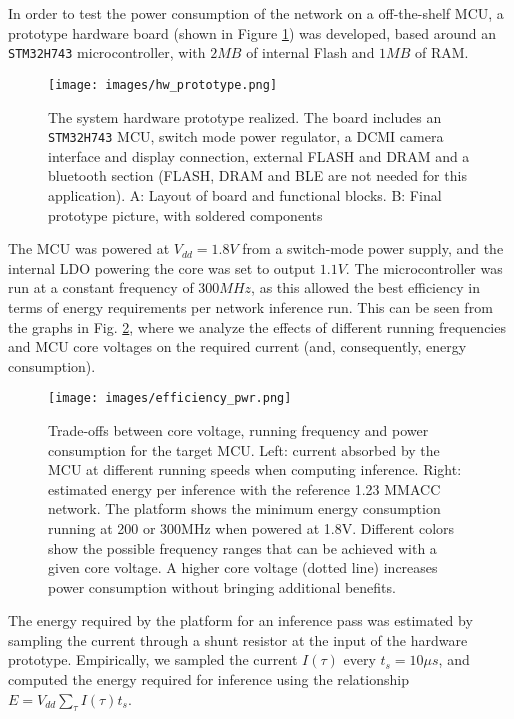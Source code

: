 In order to test the power consumption of the network on a off-the-shelf MCU, a prototype hardware board (shown in Figure \ref{fig:hw_prototype}) was developed, based around an \texttt{STM32H743} microcontroller, with $2MB$ of internal Flash and $1MB$ of RAM. 
\begin{figure}[h]
  \centering
  \texttt{[image: images/hw\_prototype.png]}   
  \caption{The system hardware prototype realized. The board includes an \texttt{STM32H743} MCU, switch mode power regulator, a DCMI camera interface and display connection, external FLASH and DRAM and a bluetooth section (FLASH, DRAM and BLE are not needed for this application).  A: Layout of board and functional blocks.  B: Final prototype picture, with soldered components}
  \label{fig:hw_prototype}
\end{figure}
The MCU was powered at $V_{dd}=1.8V$ from a switch-mode power supply, and the internal LDO powering the core was set to output $1.1V$. The microcontroller was run at a constant frequency of $300MHz$, as this allowed the best efficiency in terms of energy requirements per network inference run. This can be seen from the graphs in Fig. \ref{fig:pwr_eff}, where we analyze the effects of different running frequencies and MCU core voltages on the required current (and, consequently, energy consumption).



\begin{figure}[htbp]
  \centering
  \texttt{[image: images/efficiency\_pwr.png]}
  \caption{Trade-offs between core voltage, running frequency and power consumption for the target MCU.
  Left: current absorbed by the MCU at different running speeds when computing inference.
  Right: estimated energy per inference with the reference 1.23 MMACC network. The platform shows the minimum energy consumption running at 200 or 300MHz when powered at 1.8V. Different colors show the possible frequency ranges that can be achieved with a given core voltage. A higher core voltage (dotted line) increases power consumption without bringing additional benefits.}
  \label{fig:pwr_eff}
\end{figure}


The energy required by the platform for an inference pass was estimated by sampling the current through a shunt resistor at the input of the hardware prototype. Empirically, we sampled the current $I(\tau)$ every $t_s=10\mu s$, and computed the energy required for inference using the relationship  $E=V_{dd} \sum_\tau I(\tau) t_s$.

